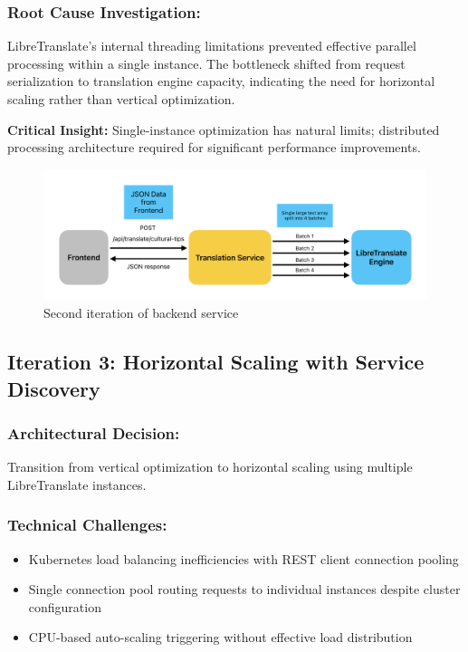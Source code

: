 \subsubsection{Root Cause Investigation:} LibreTranslate's internal threading limitations prevented effective parallel processing within a single instance. The bottleneck shifted from request serialization to translation engine capacity, indicating the need for horizontal scaling rather than vertical optimization.

\textbf{Critical Insight:} Single-instance optimization has natural limits; distributed processing architecture required for significant performance improvements.

\begin{figure}[H]
    \centering
    \includegraphics[width=1\linewidth]{chapter/05_implementation/backend/B_architectural_design/Backend_Iteration_2.pdf}
    \caption{Second iteration of backend service}
    \label{fig:backend_iteration_2}
\end{figure}

\subsection{Iteration 3: Horizontal Scaling with Service Discovery}

\subsubsection{Architectural Decision:} Transition from vertical optimization to horizontal scaling using multiple LibreTranslate instances.

\subsubsection{Technical Challenges:}
\begin{itemize}
    \item Kubernetes load balancing inefficiencies with REST client connection pooling
    \item Single connection pool routing requests to individual instances despite cluster configuration
    \item CPU-based auto-scaling triggering without effective load distribution
\end{itemize}

